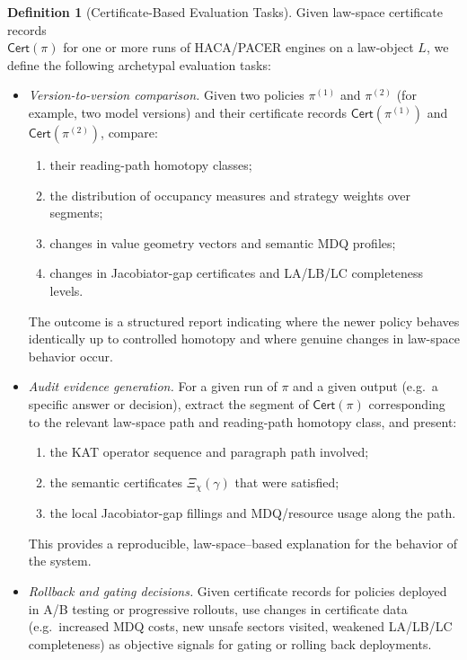 \documentclass[11pt]{book}
\theoremstyle{plain}
\theoremstyle{definition}
\newtheorem{definition}[theorem]{Definition}
\theoremstyle{remark}
\begin{document}
\begin{definition}[Certificate-Based Evaluation Tasks]
\label{def:certificate-based-evaluation-tasks}
Given law-space certificate records \\$\mathsf{Cert}(\pi)$ for one or
more runs of HACA/PACER engines on a law-object $L$, we define the
following archetypal evaluation tasks:
\begin{itemize}
  \item \emph{Version-to-version comparison.} Given two policies
        $\pi^{(1)}$ and $\pi^{(2)}$ (for example, two model versions)
        and their certificate records $\mathsf{Cert}(\pi^{(1)})$ and
        $\mathsf{Cert}(\pi^{(2)})$, compare:
        \begin{enumerate}
          \item their reading-path homotopy classes;
          \item the distribution of occupancy measures and strategy
                weights over segments;
          \item changes in value geometry vectors and semantic MDQ
                profiles;
          \item changes in Jacobiator-gap certificates and LA/LB/LC
                completeness levels.
        \end{enumerate}
        The outcome is a structured report indicating where the newer
        policy behaves identically up to controlled homotopy and where
        genuine changes in law-space behavior occur.
  \item \emph{Audit evidence generation.} For a given run of $\pi$ and
        a given output (e.g.\ a specific answer or decision), extract
        the segment of $\mathsf{Cert}(\pi)$ corresponding to the
        relevant law-space path and reading-path homotopy class, and
        present:
        \begin{enumerate}
          \item the KAT operator sequence and paragraph path involved;
          \item the semantic certificates $\Xi_\chi(\gamma)$ that were
                satisfied;
          \item the local Jacobiator-gap fillings and MDQ/resource
                usage along the path.
        \end{enumerate}
        This provides a reproducible, law-space–based explanation for
        the behavior of the system.
  \item \emph{Rollback and gating decisions.} Given certificate records
        for policies deployed in A/B testing or progressive rollouts,
        use changes in certificate data (e.g.\ increased MDQ costs,
        new unsafe sectors visited, weakened LA/LB/LC completeness) as
        objective signals for gating or rolling back deployments.
\end{itemize}
\end{definition}
\end{document}
